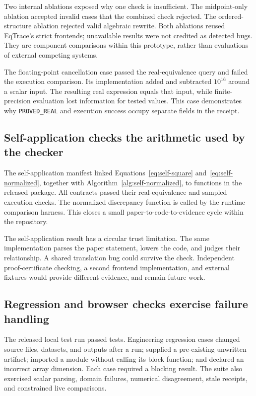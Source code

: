 Two internal ablations exposed why one check is insufficient. The midpoint-only ablation accepted \MidpointFalsePasses{} invalid cases that the combined check rejected. The ordered-structure ablation rejected \StructureFalseRejects{} valid algebraic rewrite. Both ablations reused EqTrace's strict frontends; unavailable results were not credited as detected bugs. They are component comparisons within this prototype, rather than evaluations of external competing systems.

The floating-point cancellation case passed the real-equivalence query and failed the execution comparison. Its implementation added and subtracted $10^{16}$ around a scalar input. The resulting real expression equals that input, while finite-precision evaluation lost information for tested values. This case demonstrates why \texttt{PROVED\_REAL} and execution success occupy separate fields in the receipt.

\subsection{Self-application checks the arithmetic used by the checker}
The self-application manifest linked Equations~\ref{eq:self-square} and~\ref{eq:self-normalized}, together with Algorithm~\ref{alg:self-normalized}, to functions in the released package. All \SelfContracts{} contracts passed their real-equivalence and sampled execution checks. The normalized discrepancy function is called by the runtime comparison harness. This closes a small paper-to-code-to-evidence cycle within the repository.

The self-application result has a circular trust limitation. The same implementation parses the paper statement, lowers the code, and judges their relationship. A shared translation bug could survive the check. Independent proof-certificate checking, a second frontend implementation, and external fixtures would provide different evidence, and remain future work.

\subsection{Regression and browser checks exercise failure handling}
The released local test run passed \UnitTests{} tests. Engineering regression cases changed source files, datasets, and outputs after a run; supplied a pre-existing unwritten artifact; imported a module without calling its block function; and declared an incorrect array dimension. Each case required a blocking result. The suite also exercised scalar parsing, domain failures, numerical disagreement, stale receipts, and constrained live comparisons.

